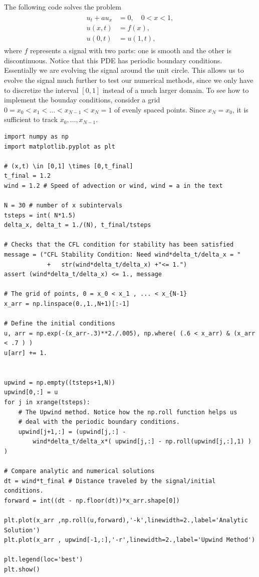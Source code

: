 The following code solves the problem 
\begin{align}
\begin{split}
	u_t +a u_x &= 0, \quad 0 < x < 1, \\
	u(x,t) &= f(x),\\
	u(0,t) &= u(1,t),
\end{split}\label{finitevolume:exercise}
\end{align}
where $f$ represents a signal with two parts: one is smooth and the other is discontinuous. Notice that this PDE has periodic boundary conditions. Essentially we are evolving the signal around the unit circle. This allows us to evolve the signal much further to test our numerical methods, since we only have to discretize the interval $[0,1]$ instead of a much larger domain. To see how to implement the bounday conditions, consider a grid $0 = x_0< x_1< \ldots< x_{N-1}< x_N = 1$ of evenly spaced points. Since $x_N = x_0$, it is sufficient to track $x_0, \ldots , x_{N-1}$.

\begin{lstlisting}
import numpy as np
import matplotlib.pyplot as plt

# (x,t) \in [0,1] \times [0,t_final]
t_final = 1.2
wind = 1.2 # Speed of advection or wind, wind = a in the text

N = 30 # number of x subintervals
tsteps = int( N*1.5)
delta_x, delta_t = 1./(N), t_final/tsteps

# Checks that the CFL condition for stability has been satisfied 
message = ("CFL Stability Condition: Need wind*delta_t/delta_x = "
			+	str(wind*delta_t/delta_x) +"<= 1.")
assert (wind*delta_t/delta_x) <= 1., message 

# The grid of points, 0 = x_0 < x_1 , ... < x_{N-1}
x_arr = np.linspace(0.,1.,N+1)[:-1]

# Define the initial conditions
u, arr = np.exp(-(x_arr-.3)**2./.005), np.where( (.6 < x_arr) & (x_arr < .7 ) )
u[arr] += 1.


upwind = np.empty((tsteps+1,N))
upwind[0,:] = u
for j in xrange(tsteps): 
	# The Upwind method. Notice how the np.roll function helps us 
	# deal with the periodic boundary conditions.
	upwind[j+1,:] = (upwind[j,:] - 
		wind*delta_t/delta_x*( upwind[j,:] - np.roll(upwind[j,:],1) ) )
		
# Compare analytic and numerical solutions
dt = wind*t_final # Distance traveled by the signal/initial conditions.
forward = int((dt - np.floor(dt))*x_arr.shape[0])

plt.plot(x_arr ,np.roll(u,forward),'-k',linewidth=2.,label='Analytic Solution')
plt.plot(x_arr , upwind[-1,:],'-r',linewidth=2.,label='Upwind Method')

plt.legend(loc='best')
plt.show()
\end{lstlisting}

